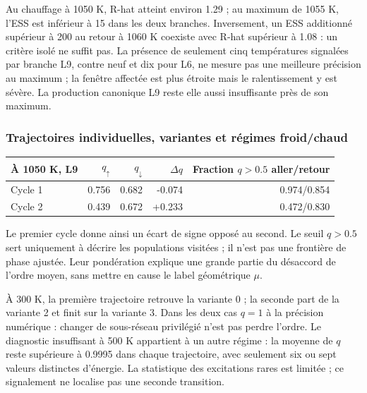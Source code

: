 Au chauffage à 1050 K, R-hat atteint environ 1.29 ; au maximum de 1055 K, l’ESS est inférieur à 15 dans les deux branches. Inversement, un ESS additionné supérieur à 200 au retour à 1060 K coexiste avec R-hat supérieur à 1.08 : un critère isolé ne suffit pas. La présence de seulement cinq températures signalées par branche L9, contre neuf et dix pour L6, ne mesure pas une meilleure précision au maximum ; la fenêtre affectée est plus étroite mais le ralentissement y est sévère. La production canonique L9 reste elle aussi insuffisante près de son maximum.

\subsubsection{Trajectoires individuelles, variantes et régimes froid/chaud}

\begin{center}\small\begin{tabular}{lrrrr}\toprule

À 1050 K, L9 & $q_\uparrow$ & $q_\downarrow$ & $\Delta q$ & Fraction $q>0.5$ aller/retour\\\midrule

Cycle 1 & 0.756 & 0.682 & -0.074 & 0.974/0.854\\

Cycle 2 & 0.439 & 0.672 & +0.233 & 0.472/0.830\\

\bottomrule\end{tabular}\end{center}

Le premier cycle donne ainsi un écart de signe opposé au second. Le seuil $q>0.5$ sert uniquement à décrire les populations visitées ; il n’est pas une frontière de phase ajustée. Leur pondération explique une grande partie du désaccord de l’ordre moyen, sans mettre en cause le label géométrique $\mu$.


À 300 K, la première trajectoire retrouve la variante 0 ; la seconde part de la variante 2 et finit sur la variante 3. Dans les deux cas $q=1$ à la précision numérique : changer de sous-réseau privilégié n’est pas perdre l’ordre. Le diagnostic insuffisant à 500 K appartient à un autre régime : la moyenne de $q$ reste supérieure à 0.9995 dans chaque trajectoire, avec seulement six ou sept valeurs distinctes d’énergie. La statistique des excitations rares est limitée ; ce signalement ne localise pas une seconde transition.

